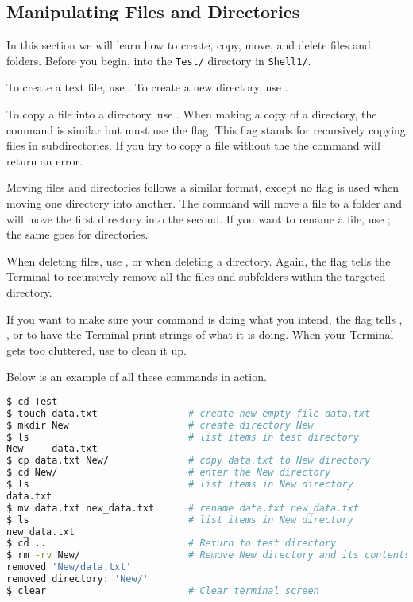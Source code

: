 \subsection*{Manipulating Files and Directories} %


In this section we will learn how to create, copy, move, and delete files and folders.
Before you begin,  into the \texttt{Test/} directory in \texttt{Shell1/}.

To create a text file, use .
To create a new directory, use .

To copy a file into a directory, use .
When making a copy of a directory, the command is similar but must use the  flag.
This flag stands for recursively copying files in subdirectories.
If you try to copy a file without the  the command will return an error.

Moving files and directories follows a similar format, except no  flag is used when moving one directory into another.
The command  will move a file to a folder and  will move the first directory into the second.
If you want to rename a file, use ; the same goes for directories.

When deleting files, use , or  when deleting a directory.
Again, the  flag tells the Terminal to recursively remove all the files and subfolders within the targeted directory.

If you want to make sure your command is doing what you intend, the  flag tells , , or  to have the Terminal print strings of what it is doing.
When your Terminal gets too cluttered, use  to clean it up.

Below is an example of all these commands in action.

\begin{lstlisting}[language=bash]
$ cd Test
$ touch data.txt				# create new empty file data.txt
$ mkdir New						# create directory New
$ ls							# list items in test directory
New 	data.txt
$ cp data.txt New/				# copy data.txt to New directory
$ cd New/						# enter the New directory
$ ls							# list items in New directory
data.txt
$ mv data.txt new_data.txt		# rename data.txt new_data.txt
$ ls							# list items in New directory
new_data.txt
$ cd ..							# Return to test directory
$ rm -rv New/					# Remove New directory and its contents
removed 'New/data.txt'
removed directory: 'New/'
$ clear							# Clear terminal screen
\end{lstlisting}


